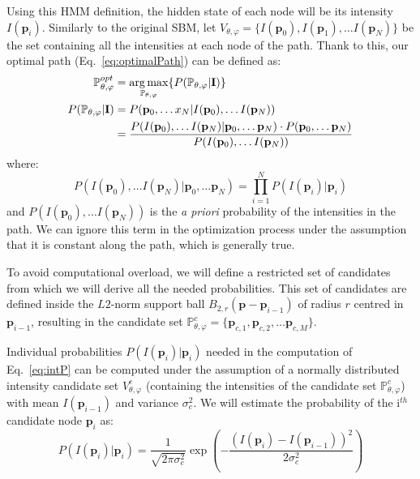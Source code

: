Using this \ac{HMM} definition, the hidden state of each node will be its intensity $I(\mathbf{p}_i)$. Similarly to the original \ac{SBM}, let $V_{\theta,\varphi} = \{I(\mathbf{p}_0), I(\mathbf{p}_1), \dots I(\mathbf{p}_N)\}$ be the set containing all the intensities at each node of the path. Thank to this, our optimal path (Eq.~\ref{eq:optimalPath}) can be defined as:
\begin{align}
\mathbb{P}_{\theta,\varphi}^{opt} & = \operatorname*{arg\,max}_{\mathbb{P}_{\theta,\varphi}} \{P(\mathbb{P}_{\theta,\varphi}|\mathbf{I})\}\\
P(\mathbb{P}_{\theta,\varphi}|\mathbf{I}) & = P(\mathbf{p}_0, \dots x_N| I(\mathbf{p}_0), \dots I(\mathbf{p}_N))\\
& = \frac{P(I(\mathbf{p}_0), \dots I(\mathbf{p}_N)|\mathbf{p}_0, \dots \mathbf{p}_N)\cdot P(\mathbf{p}_0, \dots \mathbf{p}_N)}{P(I(\mathbf{p}_0), \dots I(\mathbf{p}_N))}\label{eq:final}
\end{align}
where:
\begin{equation}\label{eq:intP}
P(I(\mathbf{p}_0), \dots I(\mathbf{p}_N)|\mathbf{p}_0, \dots \mathbf{p}_N)  = \prod_{i=1}^{N} P (I(\mathbf{p}_i)|\mathbf{p}_i)
\end{equation}
and $P(I(\mathbf{p}_0), \dots I(\mathbf{p}_N))$ is the \textit{a priori} probability of the intensities in the path. We can ignore this term in the optimization process under the assumption that it is constant along the path, which is generally true. 

To avoid computational overload, we will define a restricted set of candidates from which we will derive all the needed probabilities. This set of candidates are defined inside the $L2$-norm support ball $B_{2,r}(\mathbf{p}-\mathbf{p}_{i-1})$ of radius $r$ centred in $\mathbf{p}_{i-1}$, resulting in the candidate set $\mathbb{P}_{\theta,\varphi}^c = \{\mathbf{p}_{c,1}, \mathbf{p}_{c,2}, \dots \mathbf{p}_{c,M} \}$. 

Individual probabilities $P (I(\mathbf{p}_i)|\mathbf{p}_i)$ needed in the computation of Eq.~\ref{eq:intP} can be computed under the assumption of a normally distributed intensity candidate set $V_{\theta,\varphi}^c$ (containing the intensities of the candidate set $\mathbb{P}_{\theta,\varphi}^c$) with mean $I(\mathbf{p}_{i-1})$ and variance $\sigma_c^2$. We will estimate the probability of the i$^{th}$ candidate node $\mathbf{p}_i$ as: 
\begin{equation}\label{eq:intensity}
P(I(\mathbf{p}_i)|\mathbf{p}_i) =\frac{1}{\sqrt{2\pi \sigma_c^2}}\exp\left(-\frac{(I(\mathbf{p}_i)-I(\mathbf{p}_{i-1}))^2}{2\sigma_c^2}\right)
\end{equation}


